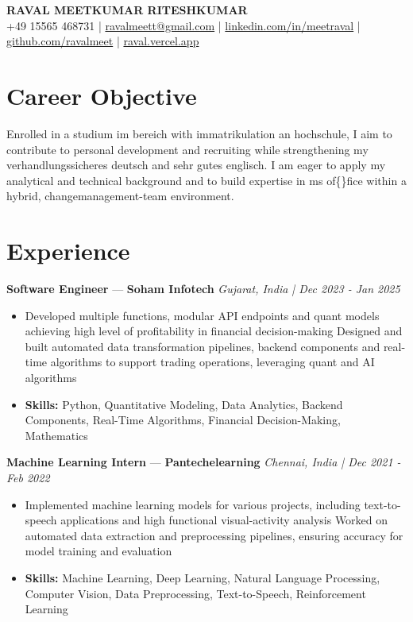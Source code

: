 \documentclass[a4paper,10pt]{article}
\begin{document}
\begin{center}
  {\Large\bfseries RAVAL MEETKUMAR RITESHKUMAR}\\[2pt]
  {\small +49 15565 468731 \;|\; \href{mailto:ravalmeett@gmail.com}{ravalmeett@gmail.com} \;|\; \href{https://www.linkedin.com/in/meetraval/}{linkedin.com/in/meetraval} \;|\; \href{https://github.com/ravalmeet}{github.com/ravalmeet} \;|\; \href{https://raval.vercel.app/}{raval.vercel.app}}
\end{center}
\vspace{-3pt}

\section*{Career Objective}
Enrolled in a studium im bereich with immatrikulation an hochschule, I aim to contribute to personal development and recruiting while strengthening my verhandlungssicheres deutsch and sehr gutes englisch. I am eager to apply my analytical and technical background and to build expertise in ms of\{\}fice within a hybrid, changemanagement-team environment.\par

\section*{Experience}
\textbf{Software Engineer} — \textbf{Soham Infotech} \hfill \textit{Gujarat, India \;|\; Dec 2023 - Jan 2025}\par
\vspace{1pt}
\begin{itemize}
  \item Developed multiple functions, modular API endpoints and quant models achieving high level of profitability in financial decision-making Designed and built automated data transformation pipelines, backend components and real-time algorithms to support trading operations, leveraging quant and AI algorithms
  \item \textbf{Skills:} Python, Quantitative Modeling, Data Analytics, Backend Components, Real-Time Algorithms, Financial Decision-Making, Mathematics
\end{itemize}
\vspace{3pt}
\textbf{Machine Learning Intern} — \textbf{Pantechelearning} \hfill \textit{Chennai, India \;|\; Dec 2021 - Feb 2022}\par
\vspace{1pt}
\begin{itemize}
  \item Implemented machine learning models for various projects, including text-to-speech applications and high functional visual-activity analysis Worked on automated data extraction and preprocessing pipelines, ensuring accuracy for model training and evaluation
  \item \textbf{Skills:} Machine Learning, Deep Learning, Natural Language Processing, Computer Vision, Data Preprocessing, Text-to-Speech, Reinforcement Learning
\end{itemize}
\end{document}
